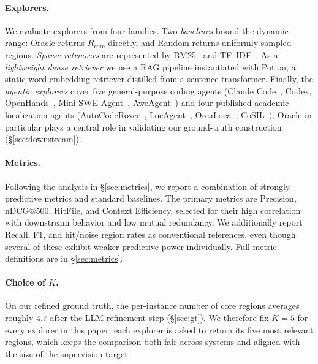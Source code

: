 \documentclass{llmxive}
\begin{document}
\paragraph{Explorers.}
We evaluate explorers from four families. Two \emph{baselines} bound the dynamic range: Oracle returns $R_{\text{core}}$ directly, and Random returns uniformly sampled regions. \emph{Sparse retrievers} are represented by BM25~\citep{robertson2009bm25} and TF--IDF~\citep{salton1988termweighting}. As a \emph{lightweight dense retriever} we use a RAG pipeline instantiated with Potion, a static word-embedding retriever distilled from a sentence transformer. Finally, the \emph{agentic explorers} cover five general-purpose coding agents (Claude Code~\citep{anthropic2025claudecode}, Codex, OpenHands~\citep{wang2024openhands}, Mini-SWE-Agent~\citep{yang2024sweagent}, AweAgent~\citep{chen2026beyondswecurrentcodeagent}) and four published academic localization agents (AutoCodeRover~\citep{zhang2024autocoderover}, LocAgent~\citep{chen2025locagent}, OrcaLoca~\citep{yu2025orcaloca}, CoSIL~\citep{jiang2025issuelocalizationllmdriveniterative}); Oracle in particular plays a central role in validating our ground-truth construction (\S\ref{sec:downstream}).


 
\paragraph{Metrics.} Following the analysis in \S\ref{sec:metrics}, we report a combination of strongly predictive metrics and standard baselines. The primary metrics are Precision, nDCG@500, HitFile, and Context Efficiency, selected for their high correlation with downstream behavior and low mutual redundancy. We additionally report Recall, F1, and hit/noise region rates as conventional references, even though several of these exhibit weaker predictive power individually. Full metric definitions are in \S\ref{sec:metrics}.

 
\paragraph{Choice of \texorpdfstring{$K$}{K}.}
On our refined ground truth, the per-instance number of core regions averages roughly $4.7$ after the LLM-refinement step (\S\ref{sec:gt}). We therefore fix $K{=}5$ for every explorer in this paper: each explorer is asked to return its five most relevant regions, which keeps the comparison both fair across systems and aligned with the size of the supervision target.
\end{document}
